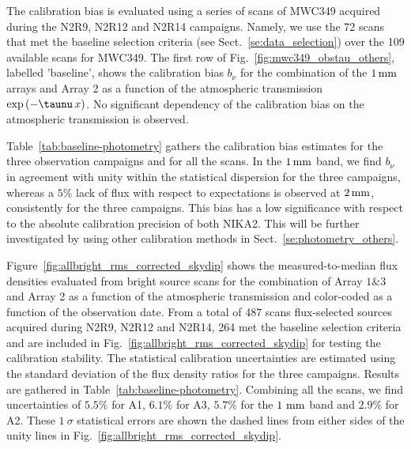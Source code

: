 The calibration bias is evaluated using a
series of scans of MWC349 acquired during the N2R9, N2R12 and N2R14
campaigns. Namely, we use the 72 scans that met the baseline selection
criteria (see Sect.~\ref{se:data_selection}) over the 109 available
scans for MWC349. The first row of
Fig.~\ref{fig:mwc349_obstau_others}, labelled 'baseline', shows the
calibration bias $b_{\nu}$ for the combination of the $1\,\rm{mm}$ arrays and
Array 2 as a function of the atmospheric transmission %
$\exp \left( - \taunu \, x \right)$. No significant dependency of the
calibration bias on the atmospheric transmission is observed. 

Table~\ref{tab:baseline-photometry} gathers the calibration bias
estimates for the three observation campaigns and for all the scans.
In the $1\,\rm{mm}$ band, we find
$b_\nu$ in agreement with unity within the statistical dispersion for
the three campaigns,
whereas a $5\%$ lack of flux with respect to expectations is observed
at $2\,\rm{mm}$, consistently for the three campaigns. This bias has a
low significance with respect to the absolute calibration precision of
both NIKA2.
This will be further investigated by using other calibration methods
in Sect.~\ref{se:photometry_others}.


Figure~\ref{fig:allbright_rms_corrected_skydip} shows the
measured-to-median flux densities evaluated from bright source scans
for the combination of Array $1\&3$ and Array 2 as a function of the
atmospheric transmission and color-coded as a function of the
observation date. From a total of 487 scans
flux-selected sources acquired during N2R9, N2R12 and N2R14, 264 met
the baseline selection criteria and are included in
Fig.~\ref{fig:allbright_rms_corrected_skydip} for testing the
calibration stability. The statistical calibration uncertainties are
estimated using the standard deviation of the flux density ratios for
the three campaigns. Results are gathered in
Table~\ref{tab:baseline-photometry}.
Combining all the scans, we find uncertainties of $5.5\%$ for A1,
$6.1\%$ for A3, $5.7\%$ for the $1~\rm{mm}$ band and $2.9\%$ for A2.
These $1~\sigma$ statistical errors are shown the dashed lines from
either sides of the unity lines in
Fig.~\ref{fig:allbright_rms_corrected_skydip}.


